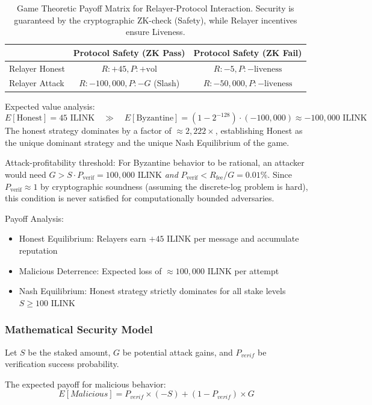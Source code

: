 \documentclass[11pt,a4paper]{article}
\begin{document}
\begin{table}[H]
\centering
\small
\begin{tabular}{l|c|c}
 & Protocol Safety (ZK Pass) & Protocol Safety (ZK Fail) \\ \hline
Relayer Honest &
  $R: +45, P: +\text{vol}$ &
  $R: -5, P: -\text{liveness}$ \\ \hline
Relayer Attack &
  $R: -100,000, P: -G$ (Slash) &
  $R: -50,000, P: -\text{liveness}$ \\ \hline
\end{tabular}
\caption{Game Theoretic Payoff Matrix for Relayer-Protocol Interaction.
Security is guaranteed by the cryptographic ZK-check (Safety), while Relayer incentives ensure Liveness.}
\label{tab:payoff}
\end{table}

Expected value analysis:
$$E[\text{Honest}] = 45\text{ ILINK} \quad \gg \quad
  E[\text{Byzantine}] = (1-2^{-128})\cdot(-100{,}000) \approx -100{,}000\text{ ILINK}$$
The honest strategy dominates by a factor of $\approx 2{,}222\times$, establishing Honest as the unique dominant strategy and the unique Nash Equilibrium of the game.

Attack-profitability threshold: For Byzantine behavior to be rational,
an attacker would need $G > S \cdot P_{\text{verif}} = 100{,}000$ ILINK \emph{and}
$P_{\text{verif}} < R_{\text{fee}} / G = 0.01\%$.  Since $P_{\text{verif}} \approx 1$
by cryptographic soundness (assuming the discrete-log problem is hard), this condition is
never satisfied for computationally bounded adversaries.

Payoff Analysis:
\begin{itemize}
    \item Honest Equilibrium: Relayers earn $+45$ ILINK per message and accumulate reputation
    \item Malicious Deterrence: Expected loss of $\approx 100{,}000$ ILINK per attempt
    \item Nash Equilibrium: Honest strategy strictly dominates for all stake levels $S \geq 100$ ILINK
\end{itemize}

\subsubsection{Mathematical Security Model}
Let $S$ be the staked amount, $G$ be potential attack gains, and $P_{verif}$ be verification success probability.

The expected payoff for malicious behavior:
$$ E[Malicious] = P_{verif} \times (-S) + (1 - P_{verif}) \times G $$
\end{document}
